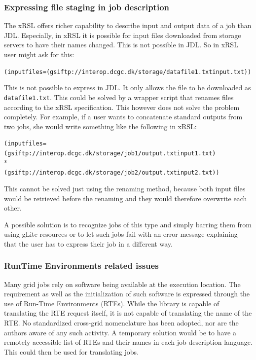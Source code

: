\documentclass{article}
\begin{document}
\subsubsection*{Expressing file staging in job description}
The xRSL offers richer capability to describe input and output data of a job than JDL. Especially, in xRSL it is possible for input files downloaded from storage servers to have their names changed. This is not possible in JDL. So in xRSL user might ask for this:
\begin{shaded}
\verb#(inputfiles=(gsiftp://interop.dcgc.dk/storage/datafile1.txtinput.txt))#
\end{shaded}
This is not possible to express in JDL. It only allows the file to be downloaded as \texttt{datafile1.txt}. This could be solved by a wrapper script that renames files according to the xRSL speciﬁcation. This however does not solve the problem completely. For example, if a user wants to concatenate standard outputs from two jobs, she would write something like the following in xRSL:
\begin{shaded}
\verb#(inputfiles=(gsiftp://interop.dcgc.dk/storage/job1/output.txtinput1.txt)#\\*
\verb#            (gsiftp://interop.dcgc.dk/storage/job2/output.txtinput2.txt))#
\end{shaded}
This cannot be solved just using the renaming method, because both input files would be retrieved before the renaming and they would therefore overwrite each other.

A possible  solution is to recognize jobs of this type and simply barring them from using gLite resources or to let such jobs fail with an error message explaining that the user has to express their job in a different way.

\subsubsection*{RunTime Environments related issues}
Many grid jobs rely on software being available at the execution location. The requirement as well as the initialization of such software is expressed through the use of Run-Time Environments (RTEs). While the library is capable of translating the RTE request itself, it is not capable of translating the name of the RTE. No standardized cross-grid nomenclature has been adopted, nor are the authors aware of any such activity. A temporary solution would be to have a remotely accessible list of RTEs and their names in each job description language. This could then be used for translating jobs.
\end{document}
